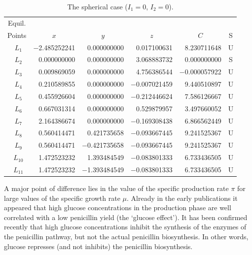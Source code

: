 \documentclass{river-journal}
\begin{document}
\begin{table}
\caption[]{The spherical case ($I_1=0$, $I_2=0$).}
\label{sphericcase}
\begin{tabular}{crrrrc}
\hline
Equil. \\
Points & \multicolumn{1}{c}{$x$} & \multicolumn{1}{c}{$y$} & \multicolumn{1}{c}{$z$} & \multicolumn{1}{c}{$C$} &
S \\
\hline
$~~L_1$ & $-$2.485252241 & 0.000000000 & 0.017100631 & 8.230711648 & U \\
$~~L_2$ &    0.000000000 & 0.000000000 & 3.068883732 & 0.000000000 & S \\
$~~L_3$ &    0.009869059 & 0.000000000 & 4.756386544 & $-$0.000057922 & U \\
$~~L_4$ &    0.210589855 & 0.000000000 & $-$0.007021459 & 9.440510897 & U \\
$~~L_5$ &    0.455926604 & 0.000000000 & $-$0.212446624 & 7.586126667 & U \\
$~~L_6$ &    0.667031314 & 0.000000000 & 0.529879957 & 3.497660052 & U \\
$~~L_7$ &    2.164386674 & 0.000000000 & $-$0.169308438 & 6.866562449 & U \\
$~~L_8$ &    0.560414471 & 0.421735658 & $-$0.093667445 & 9.241525367 & U \\
$~~L_9$ &    0.560414471 & $-$0.421735658 & $-$0.093667445 & 9.241525367 & U
\\
$~~L_{10}$ & 1.472523232 & 1.393484549 & $-$0.083801333 & 6.733436505 & U \\
$~~L_{11}$ & 1.472523232 & $-$1.393484549 & $-$0.083801333 & 6.733436505 & U
\\ \hline
\end{tabular}
\end{table}


A major point of difference lies in the value of the specific
production rate $\pi$ for large values of the specific growth rate
$\mu$.  Already in the early publications \cite{Falzon87} it
appeared that high glucose concentrations in the production phase
are well correlated with a low penicillin yield (the `glucose
effect'). It has been confirmed recently
\cite{Bunt,Cahour-thesis,BrownAndBurton,Carr-Goldstein}
that
high glucose concentrations inhibit the synthesis of the enzymes of the
penicillin pathway, but not the actual penicillin biosynthesis.
In other words, glucose represses (and not inhibits) the penicillin
biosynthesis.
\end{document}
